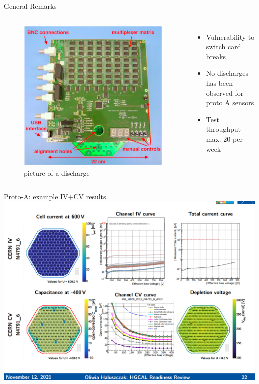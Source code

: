 \documentclass{beamer}
\begin{document}
\begin{frame}{General Remarks}
  \begin{columns}
      \begin{figure}
        \includegraphics[width=.7\textwidth]{plots/Switch_Card.png}
        \caption{picture of a discharge}
      \end{figure}

    \begin{itemize}
      \small
      \item Vulnerability to switch card breaks
      \item No discharges has been observed for proto A sensors
      \item Test throughput max. 20 per week
    \end{itemize}
  \end{columns}
\end{frame}


\begin{frame}{Proto-A: example IV+CV results}
  \includegraphics[width=.8\textwidth]{plots/IV_CV_example.png}
\end{frame}
  
\end{document}
